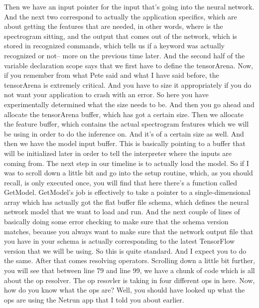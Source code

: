     Then we have an input pointer for the input
    that's going into the neural network.
    And the next two correspond to actually the application specifics,
    which are about getting the features that are needed, in other words,
    where is the spectrogram sitting, and the output that comes out
    of the network, which is stored in recognized commands, which tells us
    if a keyword was actually recognized or not--
    more on the previous time later.
    And the second half of the variable declaration scope
    says that we first have to define the tensorArena.
    Now, if you remember from what Pete said and what I have said before,
    the tensorArena is extremely critical.
    And you have to size it appropriately if you do not want your application
    to crash with an error.
    So here you have experimentally determined what the size needs to be.
    And then you go ahead and allocate the tensorArena buffer,
    which has got a certain size.
    Then we allocate the feature buffer, which
    contains the actual spectrogram features which we will be using in order
    to do the inference on.
    And it's of a certain size as well.
    And then we have the model input buffer.
    This is basically pointing to a buffer that
    will be initialized later in order to tell the interpreter where
    the inputs are coming from.
    The next step in our timeline is to actually load the model.
    So if I was to scroll down a little bit and go into the setup routine, which,
    as you should recall, is only executed once,
    you will find that here there's a function called GetModel.
    GetModel's job is effectively to take a pointer to a single-dimensional array
    which has actually got the flat buffer file
    schema, which defines the neural network model that we want to load and run.
    And the next couple of lines of basically doing some error checking
    to make sure that the schema version matches, because you always
    want to make sure that the network output file that you have
    in your schema is actually corresponding to the latest TensorFlow version
    that we will be using.
    So this is quite standard.
    And I expect you to do the same.
    After that comes resolving operators.
    Scrolling down a little bit further, you will
    see that between line 79 and line 99, we have a chunk of code which
    is all about the op resolver.
    The op resovler is taking in four different ops in here.
    Now, how do you know what the ops are?
    Well, you should have
    looked up what the ops are using the Netrun
    app that I told you about earlier.
